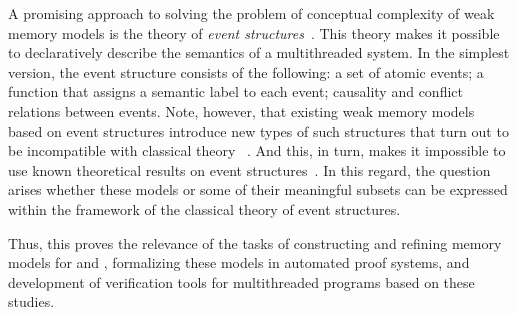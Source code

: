 A promising approach to solving the problem of conceptual complexity of weak memory models is the theory of \emph{event structures}~\autocite{Winskel:86}.
This theory makes it possible to declaratively describe the semantics of a multithreaded system.
In the simplest version, the event structure consists of the following:
a set of atomic events;
a function that assigns a semantic label to each event;
causality and conflict relations between events.
Note, however, that existing weak memory models based on event structures 
introduce new types of such structures that turn out to be incompatible with classical theory%
~\cite{Winskel:86,Nielsen-al:1981,Boudol-Castellani:1991,Langerak:91,Baldan-al:IC01}.
And this, in turn, makes it impossible to use known theoretical results
on event structures~\autocite{Vaandrager:TCS1991,Sassone:MFCS1993,Nielsen:REX93,Winskel-TCS:09}.
In this regard, the question arises whether these models or some of their meaningful subsets can be expressed within the framework of the classical theory of event structures.

Thus, this proves the relevance of the tasks of constructing and refining memory models for \CPP and \Java, formalizing these models in automated proof systems, 
and development of verification tools for multithreaded programs based on these studies.

